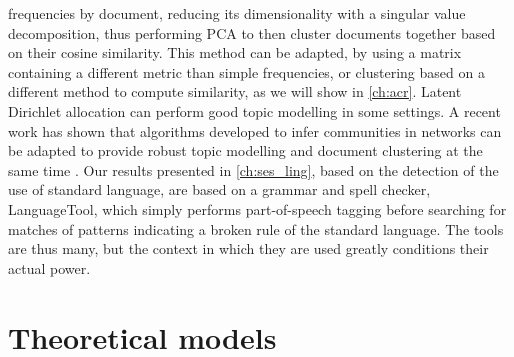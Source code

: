 \documentclass[../thesis.tex]{subfiles}
\begin{document}
frequencies by document, reducing its dimensionality with a singular value
decomposition, thus performing \ac{PCA} \cite{WoldPrincipalComponent1987} to then
cluster documents together based on their cosine similarity. This method can be adapted,
by using a matrix containing a different metric than simple frequencies, or clustering
based on a different method to compute similarity, as we will show in \cref{ch:acr}.
Latent Dirichlet allocation \cite{BleiLatentDirichlet2003} can perform good topic
modelling in some settings. A recent work has shown that algorithms developed to infer
communities in networks can be adapted to provide robust topic modelling and document
clustering at the same time \cite{GerlachNetworkApproach2018}. Our results presented in
\cref{ch:ses_ling}, based on the detection of the use of standard language, are based on
a grammar and spell checker, LanguageTool, which simply performs part-of-speech tagging
before searching for matches of patterns indicating a broken rule of the standard
language. The tools are thus many, but the context in which they are used greatly
conditions their actual power.



\section{Theoretical models}
\end{document}

